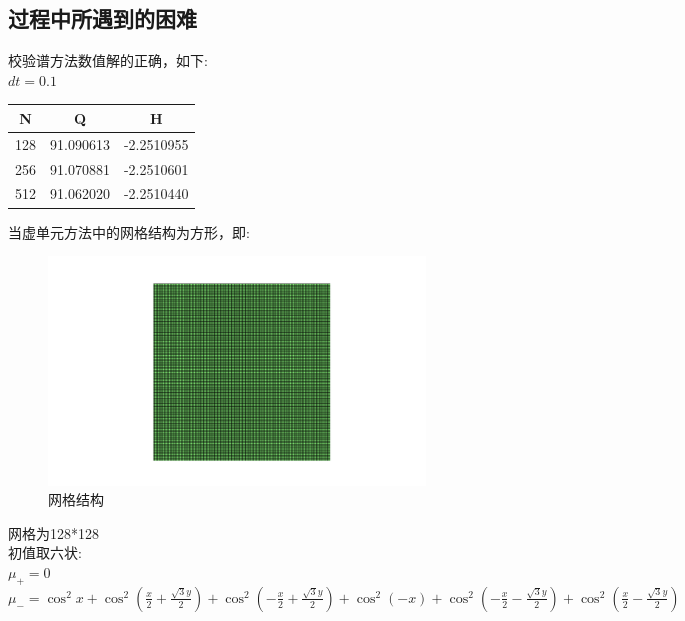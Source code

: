 \documentclass[12pt]{article}
\begin{document}
\begin{CJK}{UTF8}{gkai}
     
     
     
     
    
    
    
    
    \subsection{过程中所遇到的困难}
    
    校验谱方法数值解的正确，如下:\\
    
    $dt=0.1$\\
     \begin{table}[H]
     	\centering
     	\begin{tabular}{ccc}
     		
     		\toprule
     		N&Q & H \\
     		\midrule    
     		128&91.090613&-2.2510955\\
     		256&91.070881&-2.2510601\\
     		512&91.062020&-2.2510440\\
     		\bottomrule
     	\end{tabular}
     \end{table} 
    
     
    
    当虚单元方法中的网格结构为方形，即:\\
        \begin{figure}[H] 
        	\centering
        	\includegraphics[width=10cm]{vem.png}
        	\caption{网格结构}
        \end{figure}
        网格为128*128\\
        
    初值取六状:\\
    
        $ \mu_+=0 $\\
        
        $ \mu_-=\cos^{2}x+\cos^2 (\frac{x}{2}+\frac{\sqrt{3}y}{2})+\cos^2(-\frac{x}{2}+\frac{\sqrt{3}y}{2})+\cos^{2}(-x)+\cos^2 (-\frac{x}{2}-\frac{\sqrt{3}y}{2})+\cos^2 (\frac{x}{2}-\frac{\sqrt{3}y}{2})$\\
        

\end{CJK}
\end{document}
